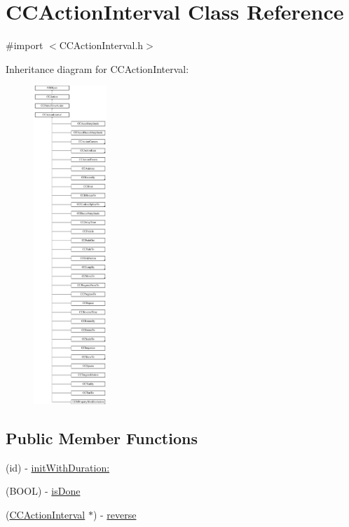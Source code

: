 \hypertarget{class_c_c_action_interval}{\section{C\-C\-Action\-Interval Class Reference}
\label{class_c_c_action_interval}
}


{\ttfamily \#import $<$C\-C\-Action\-Interval.\-h$>$}

Inheritance diagram for C\-C\-Action\-Interval\-:\begin{figure}[H]
\begin{center}
\leavevmode
\includegraphics[height=12.000000cm]{class_c_c_action_interval}
\end{center}
\end{figure}
\subsection*{Public Member Functions}
\begin{DoxyCompactItemize}
\item 
(id) -\/ \hyperlink{class_c_c_action_interval_a720052392c29747218924b70af412d6c}{init\-With\-Duration\-:}
\item 
(B\-O\-O\-L) -\/ \hyperlink{class_c_c_action_interval_a56967edca918cf8d3dfd3b5c4f2f4e85}{is\-Done}
\item 
(\hyperlink{class_c_c_action_interval}{C\-C\-Action\-Interval} $\ast$) -\/ \hyperlink{class_c_c_action_interval_a9a31f528b229f08d3aada08423f20094}{reverse}
\end{DoxyCompactItemize}
